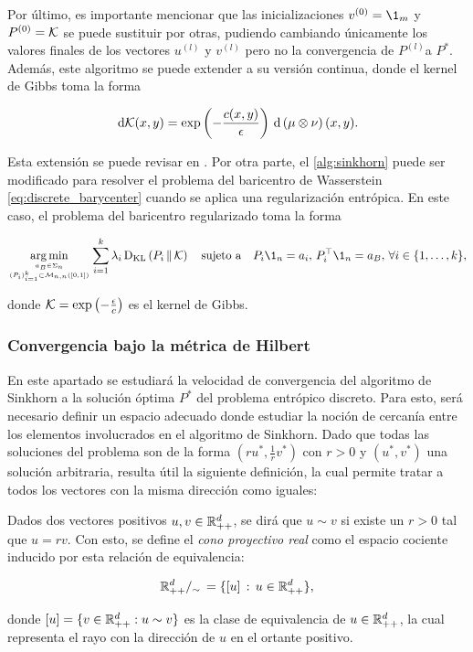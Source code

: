 Por último, es importante mencionar que las inicializaciones $v^{(0)} = \1_m$ y $P^{(0)}=\mathcal{K}$ se puede sustituir por otras, pudiendo cambiando únicamente los valores finales de los vectores $u^{(l)}$ y $v^{(l)}$ pero no la convergencia de $P^{(l)} $a $P^*$. Además, este algoritmo se puede extender a su versión continua, donde el kernel de Gibbs toma la forma

\begin{equation*}
	\,\operatorname{d}\!\mathcal{K}(x,y) = \exp\left(-\frac{c(x,y)}{\epsilon}\right)\,\operatorname{d}\!\,\left(\mu\otimes\nu\right)(x,y).
\end{equation*}

Esta extensión se puede revisar en \cite{nutz2022introduction}. Por otra parte, el \autoref{alg:sinkhorn} puede ser modificado para resolver el problema del baricentro de Wasserstein \eqref{eq:discrete_barycenter} cuando se aplica una regularización entrópica. En este caso, el problema del baricentro regularizado toma la forma

\begin{equation*}
	\argmin_{\feasible{a_B\in\Sigma_n}{(P_i)_{i=1}^k\subset \matrixspace{n,n}{[0,1]}}}
	\sum_{i=1}^k \lambda_i \KL{P_i}{\gibbs}
	\quad\text{sujeto a}\quad
	P_i\1_n = a_i,\, P_i^\top \1_n = a_B,\,\forall i\in\{1,\ldots,k\},
\end{equation*}

donde $\mathcal{K}=\exp\left(-\frac{\epsilon}{c}\right)$ es el kernel de Gibbs.


\subsubsection{Convergencia bajo la métrica de Hilbert}

En este apartado se estudiará la velocidad de convergencia del algoritmo de Sinkhorn a la solución óptima $P^*$ del problema entrópico discreto. Para esto, será necesario definir un espacio adecuado donde estudiar la noción de cercanía entre los elementos involucrados en el algoritmo de Sinkhorn. Dado que todas las soluciones del problema son de la forma $(ru^*, \frac{1}{r}v^*)$ con $r>0$ y $(u^*,v^*)$ una solución arbitraria, resulta útil la siguiente definición, la cual permite tratar a todos los vectores con la misma dirección como iguales:

\begin{defn}
	\label{defn:projective_cone}
	Dados dos vectores positivos $u,v\in\mathbb{R}^d_{++}$, se dirá que $u\sim v$ si existe un $r>0$ tal que $u=rv$. Con esto, se define el \textit{cono proyectivo real} como el espacio cociente inducido por esta relación de equivalencia:

	\begin{equation*}
		\mathbb{R}^{d}_{++}/_\sim\, = \{[u]\,:\, u\in\mathbb{R}^d_{++}\},
	\end{equation*}

	donde $[u]=\{v\in\mathbb{R}_{++}^d:u\sim v\}$ es la clase de equivalencia de $u\in\mathbb{R}^d_{++}$, la cual representa el rayo con la dirección de $u$ en el ortante positivo.
\end{defn}

